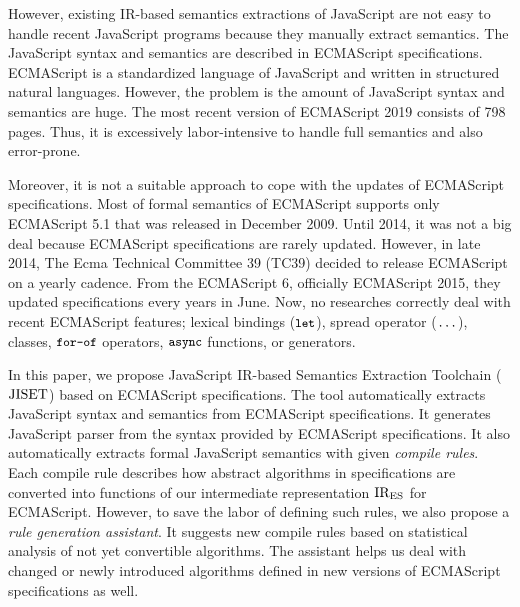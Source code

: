 However, existing IR-based semantics extractions of JavaScript are not easy to
handle recent JavaScript programs because they manually extract semantics.
The JavaScript syntax and semantics are described in ECMAScript specifications.
ECMAScript is a standardized language of JavaScript and written in structured natural languages.
However, the problem is the amount of JavaScript syntax and semantics are huge.
The most recent version of ECMAScript 2019 consists of 798 pages.
Thus, it is excessively labor-intensive to handle full semantics and also error-prone.

Moreover, it is not a suitable approach to cope with the updates of ECMAScript specifications.
Most of formal semantics of ECMAScript supports only ECMAScript 5.1 that was
released in December 2009. Until 2014, it was not a big deal because ECMAScript
specifications are rarely updated. However, in late 2014, The Ecma Technical
Committee 39 (TC39) decided to release ECMAScript on a yearly cadence. From the
ECMAScript 6, officially ECMAScript 2015, they updated specifications every years
in June. Now, no researches correctly deal with recent ECMAScript features;
lexical bindings (\( \texttt{\small let} \)), spread operator (\( \texttt{\small...} \)),
classes, \( \texttt{\small for-of} \) operators, \( \texttt{\small async} \) functions, or generators.

In this paper, we propose JavaScript IR-based Semantics Extraction Toolchain (\( \text{JISET} \))
based on ECMAScript specifications. The tool automatically extracts JavaScript
syntax and semantics from ECMAScript specifications. It generates JavaScript parser
from the syntax provided by ECMAScript specifications. It also automatically extracts
formal JavaScript semantics with given \textit{compile rules}. Each compile
rule describes how abstract algorithms in specifications are converted into
functions of our intermediate representation \( \text{IR}_\text{ES} \) for ECMAScript.
However, to save the labor of defining such rules, we also propose a \textit{rule generation assistant}.
It suggests new compile rules based on statistical analysis of not yet convertible algorithms.
The assistant helps us deal with changed or newly introduced algorithms defined in new versions of
ECMAScript specifications as well.

